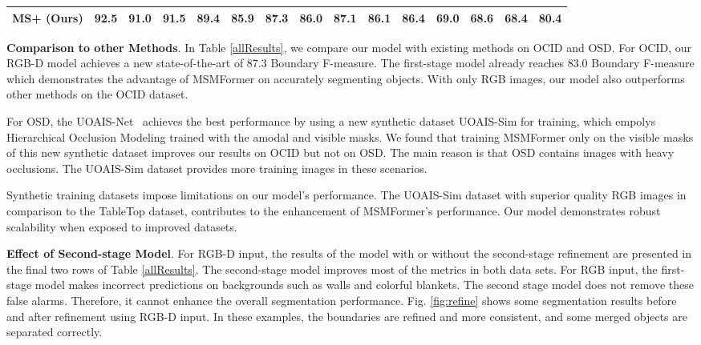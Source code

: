 \documentclass[letterpaper, 10 pt, conference]{ieeeconf}
\begin{document}
\begin{table*}
{\begin{tabular}{|l|lllllll|lllllll|}
MS+ (Ours)   & \textbf{92.5} & \textbf{91.0} & \multicolumn{1}{l|}{\textbf{91.5}} & \textbf{89.4} & 85.9          & \multicolumn{1}{l|}{\textbf{87.3}} & \textbf{86.0} & \textbf{87.1} & 86.1          & \multicolumn{1}{l|}{\textbf{86.4}} & \textbf{69.0} & 68.6          & \multicolumn{1}{l|}{\textbf{68.4}} & \textbf{80.4} \\ \hline
\end{tabular}
}
\vspace{-2mm}
\end{table*}



\textbf{Comparison to other Methods}. In Table \ref{allResults}, we compare our model with existing methods on OCID and OSD. For OCID, our RGB-D model achieves a new state-of-the-art of 87.3 Boundary F-measure. The first-stage model already reaches 83.0 Boundary F-measure which demonstrates the advantage of MSMFormer on accurately segmenting objects. With only RGB images, our model also outperforms other methods on the OCID dataset.

For OSD, the UOAIS-Net~\cite{back2022unseen} achieves the best performance by using a new synthetic dataset UOAIS-Sim for training, 
which empolys Hierarchical Occlusion Modeling trained with the amodal and visible masks. We found that training MSMFormer only on the visible masks of this new synthetic dataset improves our results on OCID but not on OSD. The main reason is that OSD contains images with heavy occlusions. The UOAIS-Sim dataset provides more training images in these scenarios.

Synthetic training datasets impose limitations on our model's performance. The UOAIS-Sim dataset with superior quality RGB images in comparison to the TableTop dataset, contributes to the enhancement of MSMFormer's performance. Our model demonstrates robust scalability when exposed to improved datasets.





\textbf{Effect of Second-stage Model}. For RGB-D input, the results of the model with or without the second-stage refinement are presented in the final two rows of Table \ref{allResults}. The second-stage model improves most of the metrics in both data sets. For RGB input, the first-stage model makes incorrect predictions on backgrounds such as walls and colorful blankets. The second stage model does not remove these false alarms. Therefore, it cannot enhance the overall segmentation performance. Fig. \ref{fig:refine} shows some segmentation results before and after refinement using RGB-D input. In these examples, the boundaries are refined and more consistent, and some merged objects are separated correctly. 
\end{document}
